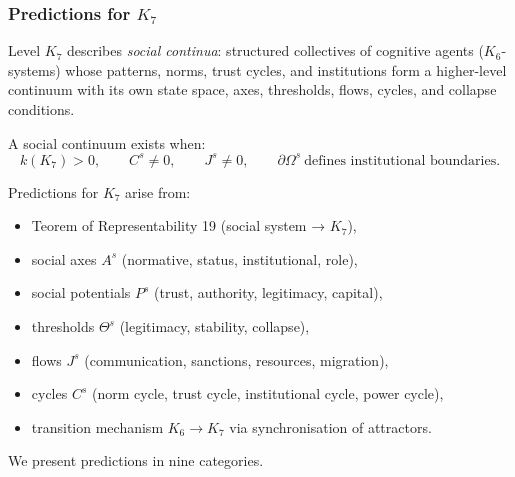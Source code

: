 

\subsubsection{Predictions for \texorpdfstring{$K_7$}{K_7}}
\label{sec:predictions-k7}

Level $K_7$ describes \emph{social continua}: structured collectives of
cognitive agents ($K_6$-systems) whose patterns, norms, trust cycles,
and institutions form a higher-level continuum with its own state space,
axes, thresholds, flows, cycles, and collapse conditions.

A social continuum exists when:
\[
k(K_7) > 0,
\qquad
C^s \neq 0,
\qquad
J^s \neq 0,
\qquad
\partial\Omega^s \ \text{defines institutional boundaries}.
\]

Predictions for $K_7$ arise from:
\begin{itemize}
    \item Teorem of Representability 19 (social system → $K_7$),
    \item social axes $A^s$ (normative, status, institutional, role),
    \item social potentials $P^s$ (trust, authority, legitimacy, capital),
    \item thresholds $\Theta^s$ (legitimacy, stability, collapse),
    \item flows $J^s$ (communication, sanctions, resources, migration),
    \item cycles $C^s$ (norm cycle, trust cycle, institutional cycle, power cycle),
    \item transition mechanism $K_6 \to K_7$ via synchronisation of attractors.
\end{itemize}

We present predictions in nine categories.

